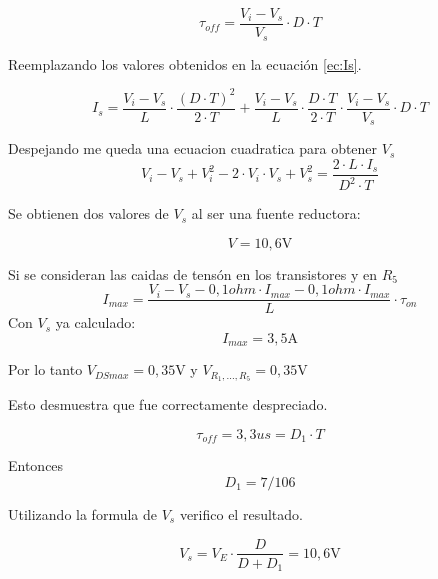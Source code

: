 \begin{equation}
 	\si{\tau}_{off}  = \frac{{V_{i} - V_{s}}}{V_s} \cdot D \cdot T 
\end{equation}

Reemplazando los valores obtenidos en la ecuación \eqref{ec:Is}.

\begin{equation}
 	I_s = \frac{{V_{i} - V_{s}}}{L} \cdot \frac{(D \cdot T)^2 }{2 \cdot T} + \frac{{V_{i} - V_{s}}}{L} \cdot \frac{D \cdot T }{2 \cdot T} \cdot \frac{{V_{i} - V_{s}}}{V_s} \cdot D \cdot T
\end{equation}

Despejando me queda una ecuacion cuadratica para obtener $V_s$
\begin{equation}
	V_i - V_s + V^2_i -2 \cdot V_i \cdot V_s + V^2_s =  \frac{2 \cdot L \cdot I_s}{D^2 \cdot T}
\end{equation}

Se obtienen dos valores de $V_s$ al ser una fuente reductora:

\begin{equation}
 	 \boxed{V = 10,6\si{\volt} }
\end{equation}

Si se consideran las caidas de tensón en los transistores y en $R_5$
\begin{equation}
	I_{max} = \frac{V_i - V_s - 0,1 \si{ohm} \cdot I_{max} - 0,1 \si{ohm} \cdot I_{max} }{L} \cdot \si{\tau}_{on}
\end{equation}
Con $V_s$ ya calculado:
\begin{equation}
	 \boxed{I_{max} = 3,5 \si{\ampere}}
\end{equation}


Por lo tanto $V_{DSmax} = 0,35 \si{\volt}$ y $V_{R_1,...,R_5} = 0,35 \si{\volt}$

Esto desmuestra que fue correctamente despreciado.


\begin{equation}
	\boxed{\tau_{off} = 3,3 us = D_1 \cdot T}
\end{equation}

Entonces
\begin{equation}
 	\boxed{D_1  = 7/ 106 }
\end{equation}

Utilizando la formula de $V_s$ verifico el resultado.

\begin{equation}
 	V_s  = V_E \cdot \frac{D}{D + D_1} = 10,6\si{\volt}
\end{equation}
